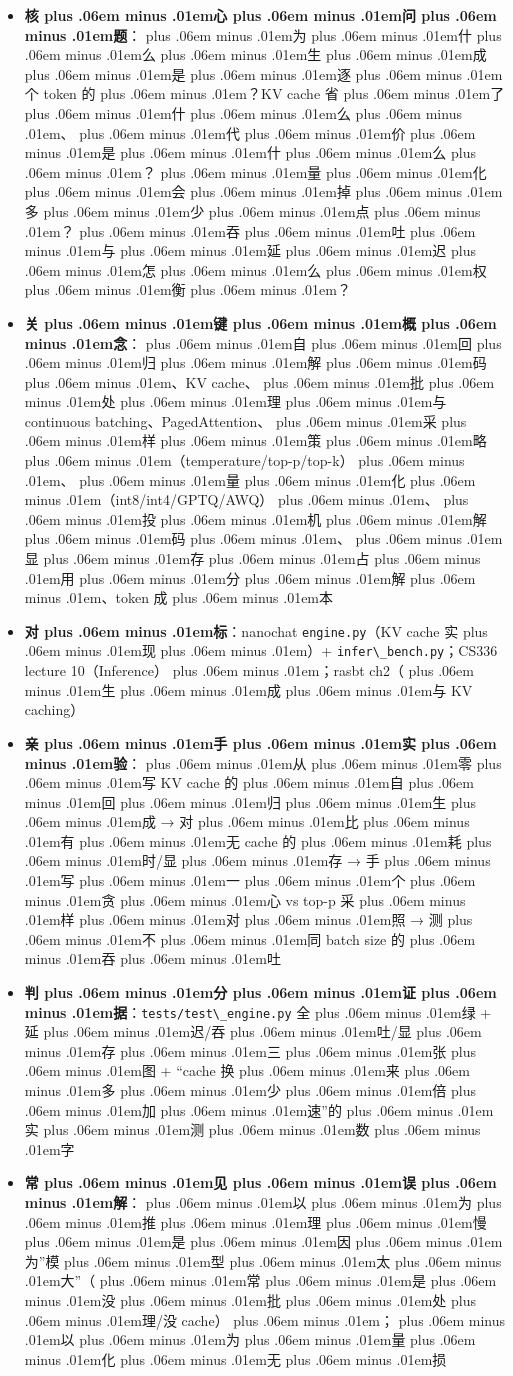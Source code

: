 \documentclass[
]{article}
\newcommand{\passthrough}[1]{#1}
\providecommand{\tightlist}{%
  \setlength{\itemsep}{0pt}\setlength{\parskip}{0pt}}
\def\zh#1{{\zhfont #1}}
\def\sym#1{{\symfont #1}}
\def\zhglue{\hskip0pt plus .06em minus .01em}
\begin{document}
\begin{itemize}
\tightlist
\item
  \textbf{\zh{核\zhglue 心\zhglue 问\zhglue 题}}\zh{：\zhglue 为\zhglue 什\zhglue 么\zhglue 生\zhglue 成\zhglue 是\zhglue 逐\zhglue 个} token \zh{的\zhglue ？}KV cache \zh{省\zhglue 了\zhglue 什\zhglue 么\zhglue 、\zhglue 代\zhglue 价\zhglue 是\zhglue 什\zhglue 么\zhglue ？\zhglue 量\zhglue 化\zhglue 会\zhglue 掉\zhglue 多\zhglue 少\zhglue 点\zhglue ？\zhglue 吞\zhglue 吐\zhglue 与\zhglue 延\zhglue 迟\zhglue 怎\zhglue 么\zhglue 权\zhglue 衡\zhglue ？}
\item
  \textbf{\zh{关\zhglue 键\zhglue 概\zhglue 念}}\zh{：\zhglue 自\zhglue 回\zhglue 归\zhglue 解\zhglue 码\zhglue 、}KV cache\zh{、\zhglue 批\zhglue 处\zhglue 理\zhglue 与} continuous batching\zh{、}PagedAttention\zh{、\zhglue 采\zhglue 样\zhglue 策\zhglue 略\zhglue （}temperature/top-p/top-k\zh{）\zhglue 、\zhglue 量\zhglue 化\zhglue （}int8/int4/GPTQ/AWQ\zh{）\zhglue 、\zhglue 投\zhglue 机\zhglue 解\zhglue 码\zhglue 、\zhglue 显\zhglue 存\zhglue 占\zhglue 用\zhglue 分\zhglue 解\zhglue 、}token \zh{成\zhglue 本}
\item
  \textbf{\zh{对\zhglue 标}}\zh{：}nanochat \passthrough{\lstinline!engine.py!}\zh{（}KV cache \zh{实\zhglue 现\zhglue ）}+ \passthrough{\lstinline!infer\_bench.py!}\zh{；}CS336 lecture 10\zh{（}Inference\zh{）\zhglue ；}rasbt ch2\zh{（\zhglue 生\zhglue 成\zhglue 与} KV caching\zh{）}
\item
  \textbf{\zh{亲\zhglue 手\zhglue 实\zhglue 验}}\zh{：\zhglue 从\zhglue 零\zhglue 写} KV cache \zh{的\zhglue 自\zhglue 回\zhglue 归\zhglue 生\zhglue 成} \sym{→} \zh{对\zhglue 比\zhglue 有\zhglue 无} cache \zh{的\zhglue 耗\zhglue 时}/\zh{显\zhglue 存} \sym{→} \zh{手\zhglue 写\zhglue 一\zhglue 个\zhglue 贪\zhglue 心} vs top-p \zh{采\zhglue 样\zhglue 对\zhglue 照} \sym{→} \zh{测\zhglue 不\zhglue 同} batch size \zh{的\zhglue 吞\zhglue 吐}
\item
  \textbf{\zh{判\zhglue 分\zhglue 证\zhglue 据}}\zh{：}\passthrough{\lstinline!tests/test\_engine.py!} \zh{全\zhglue 绿} + \zh{延\zhglue 迟}/\zh{吞\zhglue 吐}/\zh{显\zhglue 存\zhglue 三\zhglue 张\zhglue 图} + ``cache \zh{换\zhglue 来\zhglue 多\zhglue 少\zhglue 倍\zhglue 加\zhglue 速}''\zh{的\zhglue 实\zhglue 测\zhglue 数\zhglue 字}
\item
  \textbf{\zh{常\zhglue 见\zhglue 误\zhglue 解}}\zh{：\zhglue 以\zhglue 为\zhglue 推\zhglue 理\zhglue 慢\zhglue 是\zhglue 因\zhglue 为}''\zh{模\zhglue 型\zhglue 太\zhglue 大}''\zh{（\zhglue 常\zhglue 是\zhglue 没\zhglue 批\zhglue 处\zhglue 理}/\zh{没} cache\zh{）\zhglue ；\zhglue 以\zhglue 为\zhglue 量\zhglue 化\zhglue 无\zhglue 损}
\end{itemize}
\end{document}

